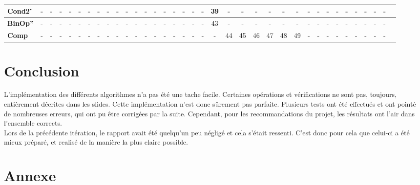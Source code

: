 \documentclass[pdftex,10pt,a4paper]{article}
\begin{document}
\begin{center}
\begin{landscape}
{\begin{tabular}{|l|c|c|c|c|c|c|c|c|c|c|c|c|c|c|c|c|c|c|c|c|c|c|c|c|c|c|c|c|c|c|c|c|c|c|c|}
			 \textbf{Cond2'} &- & - & - & - & - & - & - & - & - & - & - & - & - & - & - & - & - & - & 39 & - & - & - & - & - & - & - & - & - & - & - & - & - & - & - \\ \hline
			 \textbf{BinOp''} &- & - & - & - & - & - & - & - & - & - & - & - & - & - & - & - & - & - & 43 & - & - & - & - & - & - & - & - & - & - & - & - & - & - & - \\ \hline
			 \textbf{Comp} &- & - & - & - & - & - & - & - & - & - & - & - & - & - & - & - & - & - & - & 44 & 45 & 46 & 47 & 48 & 49 & - & - & - & - & - & - & - & - & - \\ \hline
		\end{tabular}
	}
	\end{landscape}
\end{center}

\section{Conclusion}

L'implémentation des différents algorithmes n'a pas été une tache facile. Certaines opérations et vérifications ne sont pas, toujours, entièrement décrites dans les slides. Cette implémentation n'est donc sûrement pas parfaite. Plusieurs tests ont été effectués et ont pointé de nombreuses erreurs, qui ont pu être corrigées par la suite. Cependant, pour les recommandations du projet, les résultats ont l'air dans l'ensemble corrects.\\

Lors de la précédente itération, le rapport avait été quelqu'un peu négligé et cela s'était ressenti. C'est donc pour cela que celui-ci a été mieux préparé, et realisé de la manière la plus claire possible.

\section{Annexe}
\end{document}

